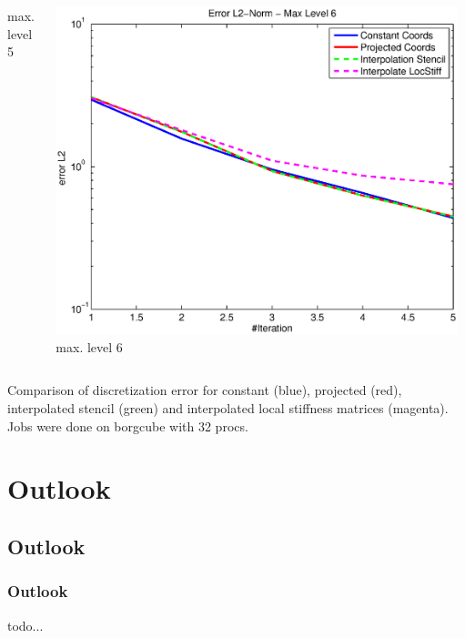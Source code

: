 \documentclass[t,compress=false,usepdftitle=false]{beamer}
\begin{document}
\begin{frame}
\begin{columns}[T]
\begin{column}[T]{4.3cm}
  max. level 5
\end{column}\hfill
\begin{column}[T]{4.3cm} 
  \centering
  \includegraphics[width=0.98\textwidth]{spherestokes_errorEuc_level6}\\
  max. level 6
\end{column}
\end{columns}
\vspace{0.5cm}
\centering
Comparison of discretization error for constant (blue), projected (red), interpolated
stencil (green) and interpolated local stiffness matrices (magenta).
Jobs were done on borgcube with 32 procs.
\end{frame}

%
\section{Outlook}
\subsection{Outlook}
%
\begin{frame}\frametitle{Outlook}
%
todo...
%
\end{frame}
%
\end{document}

